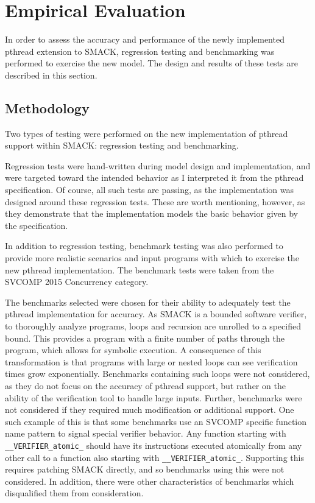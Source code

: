 \chapter{Empirical Evaluation}\label{ch:evaluation}
In order to assess the accuracy and performance of the newly
implemented pthread extension to SMACK, regression testing and
benchmarking was performed to exercise the new model.  The design and
results of these tests are described in this section.

\section{Methodology}\label{sec:methodology}
Two types of testing were performed on the new implementation of
pthread support within SMACK: regression testing and benchmarking.

Regression tests were hand-written during model design and
implementation, and were targeted toward the intended behavior as I
interpreted it from the pthread specification.  Of course, all such
tests are passing, as the implementation was designed around these
regression tests.  These are worth mentioning, however, as they
demonstrate that the implementation models the basic behavior given by
the specification. 

In addition to regression testing, benchmark testing was also
performed to provide more realistic scenarios and input programs with
which to exercise the new pthread implementation.  The benchmark tests
were taken from the SVCOMP 2015 Concurrency category.  

The benchmarks selected were chosen for their ability to adequately
test the pthread implementation for accuracy. As SMACK is a bounded
software verifier, to thoroughly analyze programs, loops and recursion
are unrolled to a specified bound.  This provides a program with a
finite number of paths through the program, which allows for symbolic
execution.  A consequence of this transformation is that programs with
large or nested loops can see verification times grow 
exponentially. Benchmarks containing such loops were not
considered, as they do not focus on the accuracy of pthread support,
but rather on the ability of the verification tool to handle large
inputs.  Further, benchmarks were not considered if they required much
modification or additional support.  One such example of this is that
some benchmarks use an SVCOMP specific function name pattern to signal
special verifier behavior.  Any function starting with
\lstinline|__VERIFIER_atomic_| should have its instructions executed
atomically from any other call to a function also starting with
\lstinline|__VERIFIER_atomic_|.  Supporting this requires patching
SMACK directly, and so benchmarks using this were not considered.  In
addition, there were other characteristics of benchmarks which
disqualified them from consideration. 

